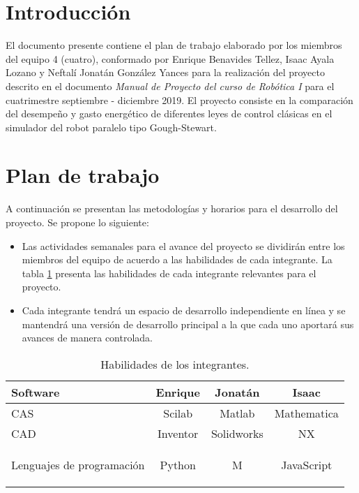 \section{Introducción}

El documento presente contiene el plan de trabajo elaborado por
los miembros del equipo 4 (cuatro), conformado por 
Enrique Benavides Tellez, Isaac Ayala Lozano y 
Neftalí Jonatán González Yances para la realización del proyecto 
descrito en el documento \emph{Manual de Proyecto del 
curso de Robótica I} para
el cuatrimestre septiembre - diciembre 2019. 
El proyecto consiste en la comparación del desempeño y gasto energético de
diferentes leyes de control clásicas en el simulador del robot
paralelo tipo Gough-Stewart. 

\section{Plan de trabajo}

A continuación se presentan las metodologías y horarios para el desarrollo del 
proyecto. Se propone lo siguiente:

\begin{itemize}
 \item Las actividades semanales para el avance del proyecto se dividirán entre 
los miembros del equipo de acuerdo a las habilidades de cada integrante. La 
tabla \ref{table: abilities} presenta las habilidades de cada integrante 
relevantes para el proyecto.
\item Cada integrante tendrá un espacio de desarrollo independiente en línea y 
se mantendrá una versión de desarrollo principal a la que cada uno aportará sus 
avances de manera controlada.


\end{itemize}
 

\begin{table}[h!]
\centering
\begin{tabular}{l|c|c|c}
Software & Enrique & Jonatán & Isaac\\
\hline
CAS  & Scilab & Matlab & Mathematica\\
CAD & Inventor & Solidworks  & NX\\
Lenguajes de programación & Python & M & JavaScript

\label{table: abilities}

\end{tabular}
\caption{Habilidades de los integrantes.} 
\end{table}



